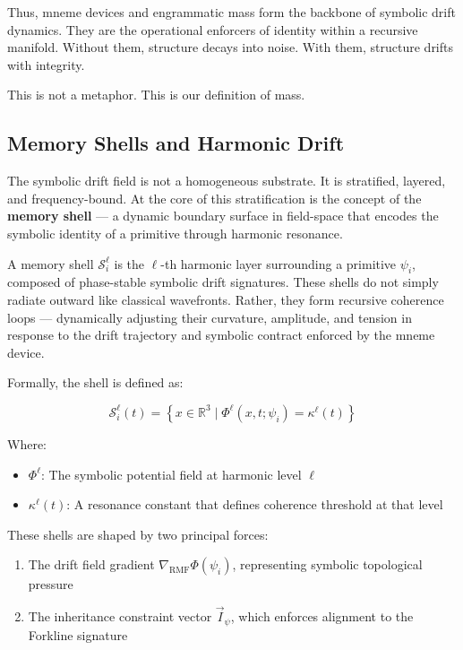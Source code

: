 \documentclass[12pt]{article}
\begin{document}
Thus, mneme devices and engrammatic mass form the backbone of symbolic drift dynamics. They are the operational enforcers of identity within a recursive manifold. Without them, structure decays into noise. With them, structure drifts with integrity.

This is not a metaphor. This is our definition of mass.

\subsection{Memory Shells and Harmonic Drift}

The symbolic drift field is not a homogeneous substrate. It is stratified, layered, and frequency-bound. At the core of this stratification is the concept of the \textbf{memory shell} — a dynamic boundary surface in field-space that encodes the symbolic identity of a primitive through harmonic resonance.

A memory shell \( \mathcal{S}_i^\ell \) is the \( \ell \)-th harmonic layer surrounding a primitive \( \psi_i \), composed of phase-stable symbolic drift signatures. These shells do not simply radiate outward like classical wavefronts. Rather, they form recursive coherence loops — dynamically adjusting their curvature, amplitude, and tension in response to the drift trajectory and symbolic contract enforced by the mneme device.

Formally, the shell is defined as:

\[
\mathcal{S}_i^\ell(t) = \left\{ x \in \mathbb{R}^3 \mid \Phi^\ell(x, t; \psi_i) = \kappa^\ell(t) \right\}
\]

Where:
\begin{itemize}[noitemsep]
  \item \( \Phi^\ell \): The symbolic potential field at harmonic level \( \ell \)
  \item \( \kappa^\ell(t) \): A resonance constant that defines coherence threshold at that level
\end{itemize}

These shells are shaped by two principal forces:
\begin{enumerate}[noitemsep]
  \item The drift field gradient \( \nabla_{\text{RMF}} \Phi(\psi_i) \), representing symbolic topological pressure
  \item The inheritance constraint vector \( \vec{I}_\psi \), which enforces alignment to the Forkline signature
\end{enumerate}
\end{document}
